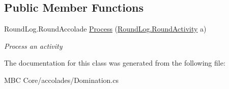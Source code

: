 \subsection*{Public Member Functions}
\begin{DoxyCompactItemize}
\item 
\hypertarget{class_m_b_c_1_1_core_1_1mbc_1_1accolades_1_1_domination_a807e3fc62f6f57ba91670cc36ba9bab7}{Round\-Log.\-Round\-Accolade \hyperlink{class_m_b_c_1_1_core_1_1mbc_1_1accolades_1_1_domination_a807e3fc62f6f57ba91670cc36ba9bab7}{Process} (\hyperlink{class_m_b_c_1_1_core_1_1_round_log_1_1_round_activity}{Round\-Log.\-Round\-Activity} a)}\label{class_m_b_c_1_1_core_1_1mbc_1_1accolades_1_1_domination_a807e3fc62f6f57ba91670cc36ba9bab7}

\begin{DoxyCompactList}\small\item\em Process an activity\end{DoxyCompactList}\end{DoxyCompactItemize}


The documentation for this class was generated from the following file\-:\begin{DoxyCompactItemize}
\item 
M\-B\-C Core/accolades/Domination.\-cs\end{DoxyCompactItemize}
